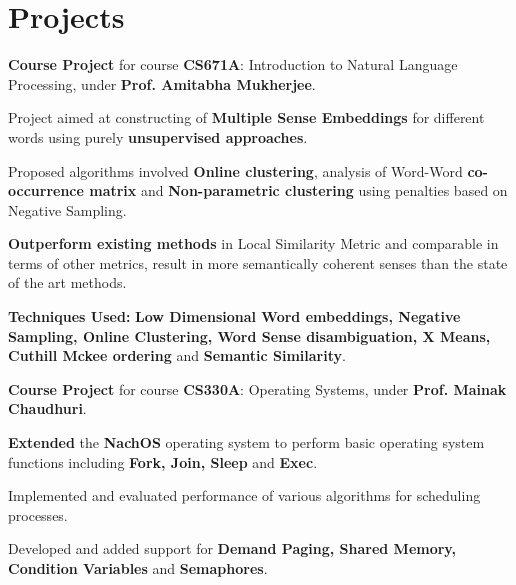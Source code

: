 \documentclass[a4paper]{norm-resume}
\begin{document}
\vspace{0mm}	%


\section{Projects}

\vspace{2mm} %

						
	\begin{tightitemize}
	\small
	{
	\item \textbf{Course Project} for course \textbf{CS671A}: Introduction to Natural Language Processing, under \textbf{Prof. Amitabha Mukherjee}.
	\item Project aimed at constructing of \textbf{Multiple Sense Embeddings} for different words using purely \textbf{unsupervised approaches}.
	\item Proposed algorithms involved \textbf{Online clustering}, analysis of Word-Word \textbf{co-occurrence matrix} and \textbf{Non-parametric clustering} using penalties based on Negative Sampling.
	\item \textbf{Outperform existing methods} in Local Similarity Metric and comparable in terms of other metrics, result in more semantically coherent senses than the state of the art methods.
	\item \textbf{Techniques Used:} \textbf{Low Dimensional Word embeddings, Negative Sampling, Online Clustering, Word Sense disambiguation, X Means, Cuthill Mckee ordering} and \textbf{Semantic Similarity}.
	}
	\end{tightitemize}
		
	\vspace{2mm}

	   \descript{July '15 - Nov '15}
	\begin{tightitemize}
	\small
	{
	\item \textbf{Course Project} for course \textbf{CS330A}: Operating Systems, under \textbf{Prof. Mainak Chaudhuri}.
	\item \textbf{Extended} the \textbf{NachOS} operating system to perform basic operating system functions including \textbf{Fork, Join, Sleep} and \textbf{Exec}. 
	\item Implemented and evaluated performance of various algorithms for scheduling processes.
	\item Developed and added support for \textbf{Demand Paging, Shared Memory, Condition Variables} and \textbf{Semaphores}.	
	}
	\end{tightitemize}
		
\end{document}
